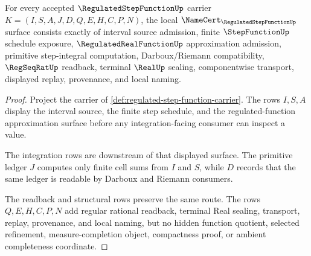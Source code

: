 \begin{theorem}
\label{thm:regulated-step-function-namecert-obligations}
For every accepted $\RegulatedStepFunctionUp$ carrier $K=(I,S,A,J,D,Q,E,H,C,P,N)$, the local $\NameCert_{\RegulatedStepFunctionUp}$ surface consists exactly of interval source admission, finite $\StepFunctionUp$ schedule exposure, $\RegulatedRealFunctionUp$ approximation admission, primitive step-integral computation, Darboux/Riemann compatibility, $\RegSeqRatUp$ readback, terminal $\RealUp$ sealing, componentwise transport, displayed replay, provenance, and local naming.
\end{theorem}
\begin{proof}
Project the carrier of \autoref{def:regulated-step-function-carrier}. The rows $I,S,A$ display the interval source, the finite step schedule, and the regulated-function approximation surface before any integration-facing consumer can inspect a value.

The integration rows are downstream of that displayed surface. The primitive ledger $J$ computes only finite cell sums from $I$ and $S$, while $D$ records that the same ledger is readable by Darboux and Riemann consumers.

The readback and structural rows preserve the same route. The rows $Q,E,H,C,P,N$ add regular rational readback, terminal Real sealing, transport, replay, provenance, and local naming, but no hidden function quotient, selected refinement, measure-completion object, compactness proof, or ambient completeness coordinate.
\end{proof}

